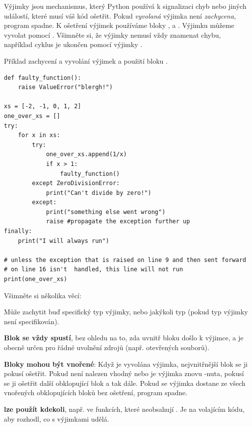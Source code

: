 \begin{syntax}
    \label{syn:exceptions}
    Výjimky jsou mechanismus, který Python používá k signalizaci chyb nebo jiných událostí, které musí váš kód ošetřit. Pokud \emph{vyvolaná} výjimka není \emph{zachycena}, program spadne. K ošetření výjimek používáme bloky ,  a . Výjimku můžeme vyvolat pomocí . Všimněte si, že výjimky nemusí vždy znamenat chybu, například cyklus  je ukončen pomocí výjimky .

    Příklad zachycení a vyvolání výjimek a použití bloku .
\begin{lstlisting}
def faulty_function():
    raise ValueError("blergh!")

xs = [-2, -1, 0, 1, 2]
one_over_xs = []
try:
    for x in xs:
        try:
            one_over_xs.append(1/x)
            if x > 1:
                faulty_function()
        except ZeroDivisionError:
            print("Can't divide by zero!")
        except:
            print("something else went wrong")
            raise #propagate the exception further up
finally:
    print("I will always run")

# unless the exception that is raised on line 9 and then sent forward
# on line 16 isn't  handled, this line will not run
print(one_over_xs)
\end{lstlisting}
    Všimněte si několika věcí:
    
    \textbf{} Může zachytit buď specifický typ výjimky, nebo jakýkoli typ (pokud typ výjimky není specifikován).
    
    \textbf{Blok  se vždy spustí}, bez ohledu na to, zda uvnitř bloku  došlo k výjimce, a je obecně určen pro řádné uvolnění zdrojů (např. otevřených souborů).
        
    \textbf{Bloky  mohou být vnořené}: Když je vyvolána výjimka, nejvnitřnější blok  se ji pokusí ošetřit. Pokud není nalezen vhodný  nebo je výjimka znovu -nuta, pokusí se ji ošetřit další obklopující blok  a tak dále. Pokud se výjimka dostane ze všech vnořených obklopujících bloků  bez ošetření, program spadne.
    
    \textbf{ lze použít kdekoli}, např. ve funkcích, které neobsahují . Je na volajícím kódu, aby rozhodl, co s výjimkami udělá.
\end{syntax}

